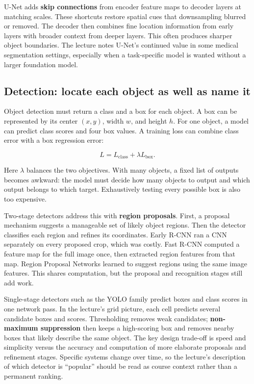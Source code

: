 U-Net adds \textbf{skip connections} from encoder feature maps to decoder layers at matching scales. These shortcuts restore spatial cues that downsampling blurred or removed. The decoder then combines fine location information from early layers with broader context from deeper layers. This often produces sharper object boundaries. The lecture notes U-Net's continued value in some medical segmentation settings, especially when a task-specific model is wanted without a larger foundation model.

\subsection{Detection: locate each object as well as name it}\label{04-visual-computing-ii-ch031-detection-locate-each-object-as-well-as-name-it}

\hypertarget{04-visual-computing-ii-ch031-detection-locate-each-object-as-well-as-name-it}{}

Object detection must return a class and a box for each object. A box can be represented by its center \((x,y)\), width \(w\), and height \(h\). For one object, a model can predict class scores and four box values. A training loss can combine class error with a box regression error:

\[
L=L_{\text{class}}+\lambda L_{\text{box}}.
\]

Here \(\lambda\) balances the two objectives. With many objects, a fixed list of outputs becomes awkward: the model must decide how many objects to output and which output belongs to which target. Exhaustively testing every possible box is also too expensive.

Two-stage detectors address this with \textbf{region proposals}. First, a proposal mechanism suggests a manageable set of likely object regions. Then the detector classifies each region and refines its coordinates. Early R-CNN ran a CNN separately on every proposed crop, which was costly. Fast R-CNN computed a feature map for the full image once, then extracted region features from that map. Region Proposal Networks learned to suggest regions using the same image features. This shares computation, but the proposal and recognition stages still add work.

Single-stage detectors such as the YOLO family predict boxes and class scores in one network pass. In the lecture's grid picture, each cell predicts several candidate boxes and scores. Thresholding removes weak candidates; \textbf{non-maximum suppression} then keeps a high-scoring box and removes nearby boxes that likely describe the same object. The key design trade-off is speed and simplicity versus the accuracy and computation of more elaborate proposals and refinement stages. Specific systems change over time, so the lecture's description of which detector is ``popular'' should be read as course context rather than a permanent ranking.

